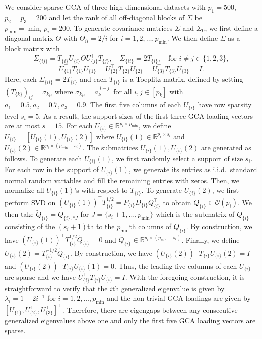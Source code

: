 \documentclass[11pt]{article}
\newcommand{\dc}[1]{\{#1\}} %
\newcommand{\0}{{\mathbf{0}}}
\begin{document}
We consider sparse GCA of three high-dimensional datasets with $p_1=500$, $p_2=p_3=200$ and let the rank of all off-diagonal blocks of $\Sigma$ be $p_{\min} = \min_i p_i = 200$. 
To generate covariance matrices $\Sigma$ and $\Sigma_0$,
we first define a diagonal matrix $\Theta$ with $\Theta_{ii}=2/i$ for $i=1, 2, \dots, p_{\min}$.
We then define $\Sigma$ as a block matrix with
\begin{equation*}
\Sigma_{\dc{ij}}=T_{\dc{i}}U_{\dc{i}}\Theta U_{\dc{j}}^\top T_{\dc{j}},\quad \Sigma_{\dc{ii}}=2T_{\dc{i}},\quad\text{for $i\neq j \in\{1,2,3\}$},
\end{equation*}\begin{equation*}
    U_{\dc{1}}^\top T_{\dc{1}}U_{\dc{1}}=U_{\dc{2}}^\top T_{\dc{2}}U_{\dc{2}}=U_{\dc{3}}^\top T_{\dc{3}}U_{\dc{3}}=I.
\end{equation*} 
Here, each $\Sigma_{\dc{ii}}=2T_{\dc{i}}$ and each $T_{\dc{i}}$ is a Toeplitz matrix, defined by setting $(T_{\dc{k}})_{ij}=\sigma_{k_{ij}}$ where $\sigma_{k_{ij}}=a_k^{|i-j|}$ for all $i,j\in [p_k]$ with $a_1=0.5, a_2=0.7, a_3=0.9$. 
The first five columns of each $U_{\dc{i}}$ have row sparsity level $s_i = 5$. 
As a result, the support sizes of the first three GCA loading vectors are at most $s = 15$.
For each $U_{\dc{i}}\in\mathbb{R}^{p_i\times p_{\min}}$, we define $U_{\dc{i}} = [U_{\dc{i}}(1), U_{\dc{i}}(2)]$ where $U_{\dc{i}}(1)\in\mathbb{R}^{p_i\times s_i}$ and $U_{\dc{i}}(2)\in\mathbb{R}^{p_i\times (p_{\min}-s_i)}$. 
The submatrices $U_{\dc{i}}(1), U_{\dc{i}}(2)$ are generated as follows.
To generate each $U_{\dc{i}}(1)$, we first randomly select a support of size $s_i$.
For each row in the support of $U_{\dc{i}}(1)$, we generate its entries as i.i.d.~standard normal random variables and fill the remaining entries with zeros. 
 Then, we normalize all $U_{\dc{i}}(1)$'s with respect to $T_{\dc{i}}$.
To generate $U_{\dc{i}}(2)$, we first perform SVD on $\left(U_{\dc{i}}(1)\right)^\top T_{\dc{i}}^{1/2}=P_{\dc{i}}D_{\dc{i}}Q_{\dc{i}}^\top$ to obtain 
$Q_{\dc{i}}\in \mathcal{O}(p_i)$. 
We then take $\widetilde{Q}_{\dc{i}} = Q_{\dc{i}, *J}$ for $J = \{s_i+1, \dots, p_{\min}\}$ which is the submatrix of ${Q}_{\dc{i}}$ consisting of the $(s_i+1)$th to the $p_{\min}$th columns of $Q_{\dc{i}}$. 
By construction, we have $\left(U_{\dc{i}}(1)\right)^\top T_{\dc{i}}^{1/2}\widetilde{Q}_{\dc{i}}=0$ and $\widetilde{Q}_{\dc{i}}\in\mathbb{R}^{p_i\times (p_{\min}-s_i)}$. 
Finally, we define $U_{\dc{i}}(2) = T_{\dc{i}}^{-1/2}\widetilde{Q}_{\dc{i}}$.
By construction, we have $\left(U_{\dc{i}}(2)\right)^\top T_{\dc{i}}U_{\dc{i}}(2) = I$ and $\left(U_{\dc{i}}(2)\right)^\top T_{\dc{i}}U_{\dc{i}}(1) = 0$. 
Thus, the leading five columns of each $U_{\dc{i}}$ are sparse and we have $U_{\dc{i}}^\top T_{\dc{i}}U_{\dc{i}} = I$.
With the foregoing construction, it is straightforward to verify that the $i$th generalized eigenvalue is given by $\lambda_i = 1 +2i^{-1}$ for $i =1, 2, \dots, p_{\min}$ and the non-trivial GCA loadings are given by $[U_{\dc{1}}^\top, U_{\dc{2}}^\top, U_{\dc{3}}^\top]^\top$. Therefore, there are eigengaps between any consecutive generalized eigenvalues above one and only the first five GCA loading vectors are sparse. 
\end{document}
